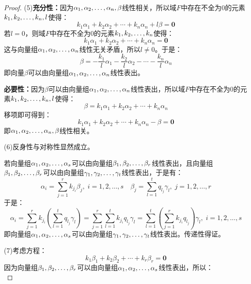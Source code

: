 \begin{proof}
	(5)\textbf{充分性：}因为$\alpha_1, \alpha_2, \dots, \alpha_{n},\beta$线性相关，所以域$F$中存在不全为$0$的元素$k_1, k_2, \dots, k_{n},l$使得：
	\begin{equation*}
		k_1\alpha_1+k_2\alpha_2+\cdots+k_n\alpha_n+l\beta=\mathbf{0}
	\end{equation*}
	若$l=0$，则域$F$中存在不全为$0$的元素$k_1, k_2, \dots, k_{n}$使得：
	\begin{equation*}
		k_1\alpha_1+k_2\alpha_2+\cdots+k_n\alpha_n=\mathbf{0}
	\end{equation*}
	这与向量组$\alpha_1, \alpha_2, \dots, \alpha_{n}$线性无关矛盾，所以$l\ne0$。于是：
	\begin{equation*}
		\beta=-\frac{k_1}{l}\alpha_1-\frac{k_2}{l}\alpha_2-\cdots-\frac{k_n}{l}\alpha_n
	\end{equation*}
	即向量$\beta$可以由向量组$\alpha_1, \alpha_2, \dots, \alpha_{n}$线性表出。\par
	\textbf{必要性：}因为$\beta$可以由向量组$\alpha_1, \alpha_2, \dots, \alpha_{n}$线性表出，所以域$F$中存在不全为$0$的元素$k_1, k_2, \dots, k_{n},l$使得：
	\begin{equation*}
		\beta=k_1\alpha_1+k_2\alpha_2+\cdots+k_n\alpha_n
	\end{equation*}
	移项即可得到：
	\begin{equation*}
		k_1\alpha_1+k_2\alpha_2+\cdots+k_n\alpha_n-\beta=\mathbf{0}
	\end{equation*}
	即$\alpha_1, \alpha_2, \dots, \alpha_{n},\beta$线性相关。\par
	(6)反身性与对称性显然成立。\par
	若向量组$\alpha_1, \alpha_2, \dots, \alpha_{s}$可以由向量组$\beta_1, \beta_2, \dots, \beta_{r}$线性表出，且向量组$\beta_1, \beta_2, \dots, \beta_{r}$可以由向量组$\gamma_1, \gamma_2, \dots, \gamma_{t}$线性表出，于是有：
	\begin{equation*}
		\alpha_i=\sum_{j=1}^{r}k_{j_i}\beta_j,\;i=1,2,\dots,s\quad
		\beta_j=\sum_{l=1}^{t}q_{l_j}\gamma_l,\;j=1,2,\dots,r
	\end{equation*}
	于是：
	\begin{equation*}
		\alpha_i=\sum_{j=1}^{r}k_{j_i}\left(\sum_{l=1}^{t}q_{l_j}\gamma_l\right)=\sum_{j=1}^{r}\sum_{l=1}^{t}k_{j_i}q_{l_j}\gamma_l=\sum_{l=1}^{t}\left(\sum_{j=1}^{r}k_{j_i}q_{l_j}\right)\gamma_l,\;i=1,2,\dots,s
	\end{equation*}
	即向量组$\alpha_1, \alpha_2, \dots, \alpha_{s}$可以由向量组$\gamma_1, \gamma_2, \dots, \gamma_{t}$线性表出。传递性得证。\par
	(7)考虑方程：
	\begin{equation*}
		k_1\beta_1+k_2\beta_2+\cdots+k_r\beta_r=\mathbf{0}
	\end{equation*}
	因为向量组$\beta_1, \beta_2, \dots, \beta_{r}$可以由向量组$\alpha_1, \alpha_2, \dots, \alpha_{s}$线性表出，所以：
	\begin{equation*}

\end{equation*}
\end{proof}
